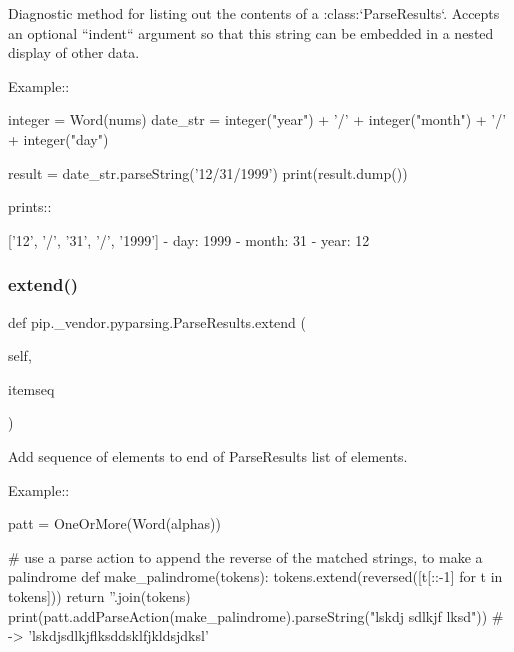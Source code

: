 \begin{DoxyVerb}Diagnostic method for listing out the contents of
a :class:`ParseResults`. Accepts an optional ``indent`` argument so
that this string can be embedded in a nested display of other data.

Example::

    integer = Word(nums)
    date_str = integer("year") + '/' + integer("month") + '/' + integer("day")

    result = date_str.parseString('12/31/1999')
    print(result.dump())

prints::

    ['12', '/', '31', '/', '1999']
    - day: 1999
    - month: 31
    - year: 12
\end{DoxyVerb}
 \mbox{\label{classpip_1_1__vendor_1_1pyparsing_1_1ParseResults_acd6c647ae66379e661f5c348d714e0e9}} 
\subsubsection{\texorpdfstring{extend()}{extend()}}
{\footnotesize\ttfamily def pip.\+\_\+vendor.\+pyparsing.\+Parse\+Results.\+extend (\begin{DoxyParamCaption}\item[{}]{self,  }\item[{}]{itemseq }\end{DoxyParamCaption})}

\begin{DoxyVerb}Add sequence of elements to end of ParseResults list of elements.

Example::

    patt = OneOrMore(Word(alphas))

    # use a parse action to append the reverse of the matched strings, to make a palindrome
    def make_palindrome(tokens):
tokens.extend(reversed([t[::-1] for t in tokens]))
return ''.join(tokens)
    print(patt.addParseAction(make_palindrome).parseString("lskdj sdlkjf lksd")) # -> 'lskdjsdlkjflksddsklfjkldsjdksl'
\end{DoxyVerb}
 \mbox{\label{classpip_1_1__vendor_1_1pyparsing_1_1ParseResults_ab91e8c6a8caaa242c3d3ba351f551d23}} 
